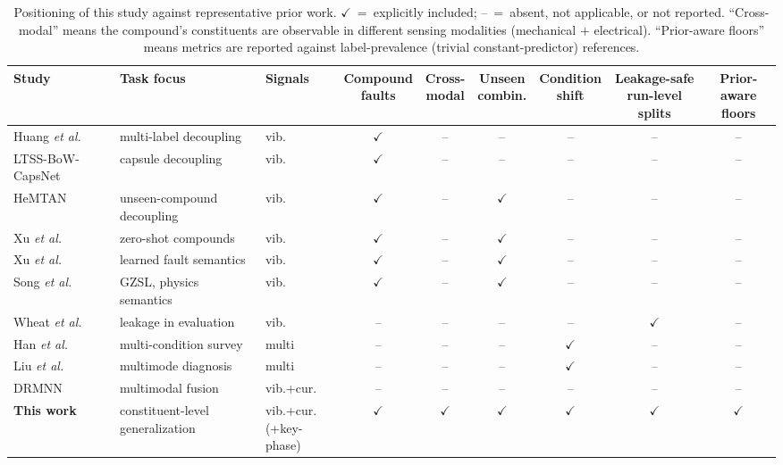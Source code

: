 \begin{table}[!t]
\caption{Positioning of this study against representative prior work.
$\checkmark$~=~explicitly included; --~=~absent, not applicable, or not
reported. ``Cross-modal'' means the compound's constituents are observable
in different sensing modalities (mechanical $+$ electrical). ``Prior-aware
floors'' means metrics are reported against label-prevalence (trivial
constant-predictor) references.}
\label{tab:positioning}
\centering
\footnotesize
\setlength{\tabcolsep}{4.5pt}
\begin{tabular}{l l l c c c c c c}
\toprule
Study & Task focus & Signals & \makecell{Compound\\faults} &
\makecell{Cross-\\modal} & \makecell{Unseen\\combin.} &
\makecell{Condition\\shift} & \makecell{Leakage-safe\\run-level splits} &
\makecell{Prior-aware\\floors} \\
\midrule
Huang \emph{et al.} \cite{huang2019ddcnn} & multi-label decoupling & vib. & $\checkmark$ & -- & -- & -- & -- & -- \\
LTSS-BoW-CapsNet \cite{ltssbow2024} & capsule decoupling & vib. & $\checkmark$ & -- & -- & -- & -- & -- \\
HeMTAN \cite{hemtan2024} & unseen-compound decoupling & vib. & $\checkmark$ & -- & $\checkmark$ & -- & -- & -- \\
Xu \emph{et al.} \cite{eswa2022} & zero-shot compounds & vib. & $\checkmark$ & -- & $\checkmark$ & -- & -- & -- \\
Xu \emph{et al.} \cite{eswa2023} & learned fault semantics & vib. & $\checkmark$ & -- & $\checkmark$ & -- & -- & -- \\
Song \emph{et al.} \cite{song2025gzsl} & GZSL, physics semantics & vib. & $\checkmark$ & -- & $\checkmark$ & -- & -- & -- \\
Wheat \emph{et al.} \cite{wheat2024} & leakage in evaluation & vib. & -- & -- & -- & -- & $\checkmark$ & -- \\
Han \emph{et al.} \cite{han2025} & multi-condition survey & multi & -- & -- & -- & $\checkmark$ & -- & -- \\
Liu \emph{et al.} \cite{liu2024tii} & multimode diagnosis & multi & -- & -- & -- & $\checkmark$ & -- & -- \\
DRMNN \cite{drmnn2020} & multimodal fusion & vib.+cur. & -- & -- & -- & -- & -- & -- \\
\midrule
\textbf{This work} & \makecell[l]{constituent-level\\generalization} &
\makecell[l]{vib.+cur.\\(+key-phase)} & $\checkmark$ & $\checkmark$ &
$\checkmark$ & $\checkmark$ & $\checkmark$ & $\checkmark$ \\
\bottomrule
\end{tabular}
\end{table}
